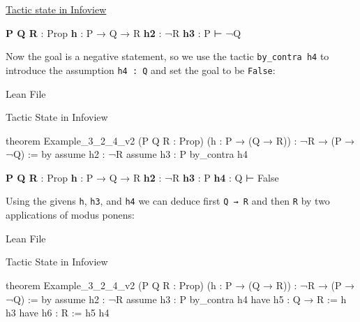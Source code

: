 \documentclass[
  letterpaper,
  DIV=11,
  numbers=noendperiod]{scrreprt}
\newenvironment{Shaded}{\begin{snugshade}}{\end{snugshade}}
\newcommand{\InformationTok}[1]{\textcolor[rgb]{0.37,0.37,0.37}{#1}}
\newcommand{\KeywordTok}[1]{\textcolor[rgb]{0.00,0.23,0.31}{#1}}
\newcommand{\NormalTok}[1]{\textcolor[rgb]{0.00,0.23,0.31}{#1}}
\renewcommand{\KeywordTok}[1]{\textcolor[HTML]{0000FF}{#1}}
\renewcommand{\InformationTok}[1]{\textcolor[HTML]{D2691E}{\textbf{#1}}}
\newenvironment{outpt}
	{\begin{minipage}[t]{0.33\textwidth}}
	{\end{minipage}}
\begin{document}
\begin{outpt}

\uline{Tactic state in Infoview}

\begin{Shaded}
\begin{Highlighting}[]
\InformationTok{P Q R }\NormalTok{: Prop}
\InformationTok{h }\NormalTok{: P → Q → R}
\InformationTok{h2 }\NormalTok{: ¬R}
\InformationTok{h3 }\NormalTok{: P}
\NormalTok{⊢ ¬Q}
\end{Highlighting}
\end{Shaded}

\end{outpt}

Now the goal is a negative statement, so we use the tactic
\texttt{by\_contra\ h4} to introduce the assumption \texttt{h4\ :\ Q}
and set the goal to be \texttt{False}:

Lean File

Tactic State in Infoview

\begin{Shaded}
\begin{Highlighting}[]
\KeywordTok{theorem}\NormalTok{ Example\_3\_2\_4\_v2 (P Q R : }\KeywordTok{Prop}\NormalTok{)}
\NormalTok{(h : P → (Q → R)) : ¬R → (P → ¬Q) := }\KeywordTok{by}
  \KeywordTok{assume}\NormalTok{ h2 : ¬R}
  \KeywordTok{assume}\NormalTok{ h3 : P}
  \KeywordTok{by\_contra}\NormalTok{ h4}
\end{Highlighting}
\end{Shaded}

\begin{Shaded}
\begin{Highlighting}[]
\InformationTok{P Q R }\NormalTok{: Prop}
\InformationTok{h }\NormalTok{: P → Q → R}
\InformationTok{h2 }\NormalTok{: ¬R}
\InformationTok{h3 }\NormalTok{: P}
\InformationTok{h4 }\NormalTok{: Q}
\NormalTok{⊢ False}
\end{Highlighting}
\end{Shaded}

Using the givens \texttt{h}, \texttt{h3}, and \texttt{h4} we can deduce
first \texttt{Q\ →\ R} and then \texttt{R} by two applications of modus
ponens:

Lean File

Tactic State in Infoview

\begin{Shaded}
\begin{Highlighting}[]
\KeywordTok{theorem}\NormalTok{ Example\_3\_2\_4\_v2 (P Q R : }\KeywordTok{Prop}\NormalTok{)}
\NormalTok{(h : P → (Q → R)) : ¬R → (P → ¬Q) := }\KeywordTok{by}
  \KeywordTok{assume}\NormalTok{ h2 : ¬R}
  \KeywordTok{assume}\NormalTok{ h3 : P}
  \KeywordTok{by\_contra}\NormalTok{ h4}
  \KeywordTok{have}\NormalTok{ h5 : Q → R := h h3}
  \KeywordTok{have}\NormalTok{ h6 : R := h5 h4}
\end{Highlighting}
\end{Shaded}
\end{document}
